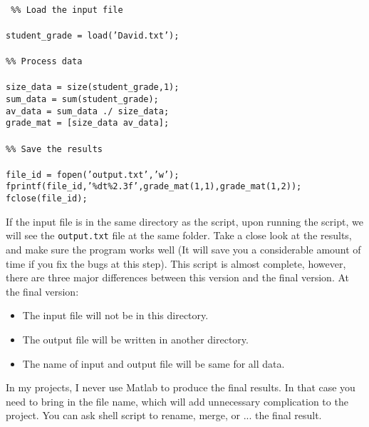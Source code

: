 \begin{mdframed}[hidealllines=true,backgroundcolor=gray!20]
\begin{singlespace}
\fontsize{10pt}{1pt}
\texttt{
\\
\noindent
{ \color{matlab_green} \%\% Load the input file} \\
\\
 student\_grade = load({\color{matlab_pink}'David.txt'}); \\
 \\
 {\color{matlab_green}\%\% Process data}\\
 \\
size\_data = size(student\_grade,1);\\
sum\_data = sum(student\_grade); \\
av\_data = sum\_data ./ size\_data; \\
grade\_mat = [size\_data av\_data]; \\
\\
{\color{matlab_green}\%\% Save the results}\\
\\
 file\_id = fopen({\color{matlab_pink}'output.txt'},{\color{matlab_pink}'w'});\\
 fprintf(file\_id,{\color{matlab_pink}'\%dt\%2.3f'},grade\_mat(1,1),grade\_mat(1,2));\\
 fclose(file\_id);\\
 }
\end{singlespace}
\end{mdframed}

\noindent
If the input file is in the same directory as the script, upon running the script, we will see the \texttt{output.txt} file at the same folder. Take a close look at the results, and make sure the program works well (It will save you a considerable amount of time if you fix the bugs at this step). This script is almost complete, however, there are three major differences between this version and the final version. At the final version:

\begin{itemize}
\item{The input file will not be in this directory.}
\item{The output file will be written in another directory.}
\item{The name of input and output file will be same for all data.}
\end{itemize}
\noindent
In my projects, I never use Matlab to produce the final results. In that case you need to bring in the file name, which will add unnecessary complication to the project. You can ask shell script to rename, merge, or ... the final result. \\



